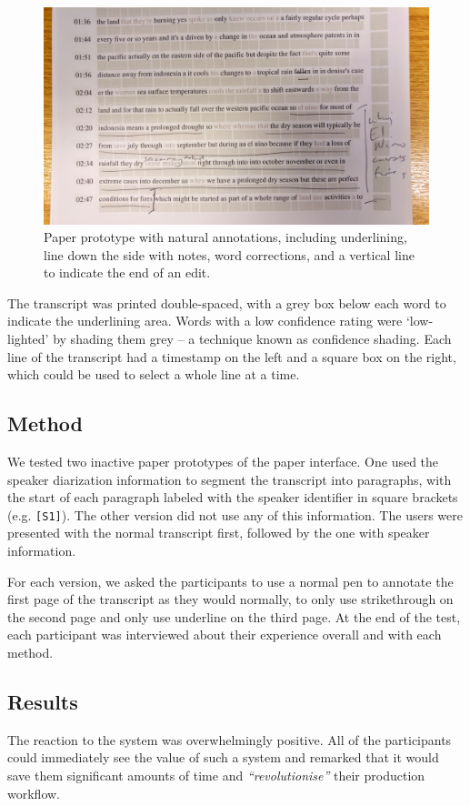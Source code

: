 \begin{figure}[h]
  \centering
  \includegraphics[width=\columnwidth]{figs/mockup}
  \caption{Paper prototype with natural annotations, including
    underlining, line down the side with notes, word corrections, and a
    vertical line to indicate the end of an edit.}
  \label{fig:natural}
\end{figure}

The transcript was printed double-spaced, with a grey box below each word to indicate the underlining area.  Words with
a low confidence rating were `low-lighted' by shading them grey -- a technique known as confidence
shading\cite{Vemuri2004}.  Each line of the transcript had a timestamp on the left and a square box on the right, which
could be used to select a whole line at a time.

\subsection{Method}
We tested two inactive paper prototypes of the paper interface.  One used the speaker diarization information to
segment the transcript into paragraphs, with the start of each paragraph labeled with the speaker identifier in square
brackets (e.g.  \texttt{{[}S1{]}}). The other version did not use any of this information. The users were presented
with the normal transcript first, followed by the one with speaker information.

For each version, we asked the participants to use a normal pen to annotate the first page of the transcript as they
would normally, to only use strikethrough on the second page and only use underline on the third page. At the end of
the test, each participant was interviewed about their experience overall and with each method.

\subsection{Results}
The reaction to the system was overwhelmingly positive. All of the participants could immediately see the value of such
a system and remarked that it would save them significant amounts of time and \textit{``revolutionise''} their
production workflow.

